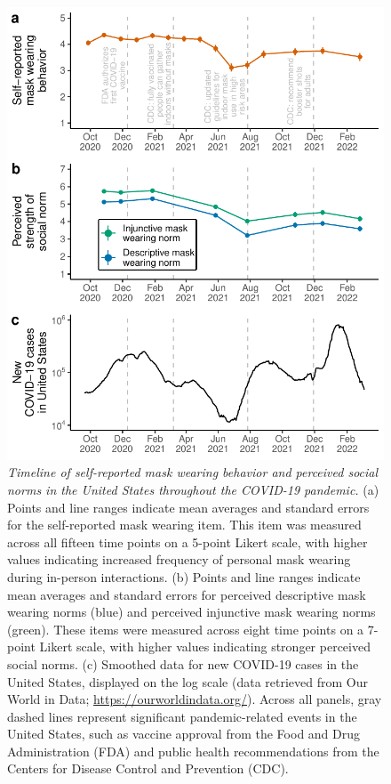 \documentclass[
  english,
  man,floatsintext]{apa6}
\begin{document}
\begin{figure}
\centering
\includegraphics{manuscript_files/figure-latex/plotTimeline-1.pdf}
\caption{\label{fig:plotTimeline}\emph{Timeline of self-reported mask wearing behavior and perceived social norms in the United States throughout the COVID-19 pandemic.} (a) Points and line ranges indicate mean averages and standard errors for the self-reported mask wearing item. This item was measured across all fifteen time points on a 5-point Likert scale, with higher values indicating increased frequency of personal mask wearing during in-person interactions. (b) Points and line ranges indicate mean averages and standard errors for perceived descriptive mask wearing norms (blue) and perceived injunctive mask wearing norms (green). These items were measured across eight time points on a 7-point Likert scale, with higher values indicating stronger perceived social norms. (c) Smoothed data for new COVID-19 cases in the United States, displayed on the log scale (data retrieved from Our World in Data; \url{https://ourworldindata.org/}). Across all panels, gray dashed lines represent significant pandemic-related events in the United States, such as vaccine approval from the Food and Drug Administration (FDA) and public health recommendations from the Centers for Disease Control and Prevention (CDC).}
\end{figure}
\end{document}
